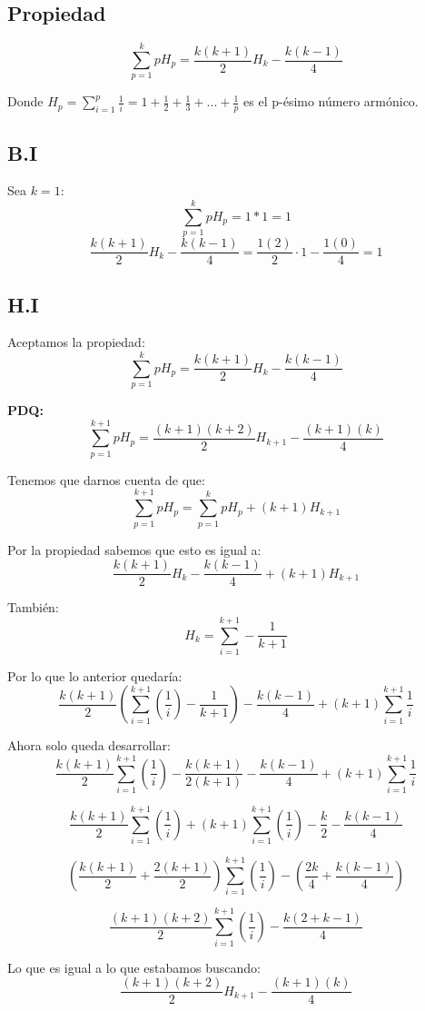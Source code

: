 \documentclass[../doc.tex]{subfiles}
\begin{document}
\subsection{Propiedad}
\[\sum_{p=1}^{k} pH_p = \frac{k(k + 1)}{2}H_k - \frac{k(k-1)}{4}\]

Donde \(H_p = \sum_{i=1}^{p} \frac{1}{i} = 1 + \frac{1}{2} + \frac{1}{3}
+ ... +\frac{1}{p}\) es el p-ésimo número armónico.

\subsection{B.I}
Sea \(k = 1\):
\[\sum_{p=1}^{k} pH_p = 1*1 = 1\]
\[\frac{k(k + 1)}{2}H_k - \frac{k(k-1)}{4} = \frac{1(2)}{2} \cdot 1 - \frac{1(0)}{4} = 1\]

\subsection{H.I}
Aceptamos la propiedad:
\[\sum_{p=1}^{k} pH_p = \frac{k(k + 1)}{2}H_k - \frac{k(k-1)}{4}\]

\textbf{PDQ:}
\[\sum_{p=1}^{k+1} pH_p = \frac{(k+1)(k+2)}{2}H_{k+1} - \frac{(k+1)(k)}{4}\]

\noindent Tenemos que darnos cuenta de que:
\[\sum_{p=1}^{k+1} pH_p = \sum_{p=1}^{k} pH_p + (k+1)H_{k+1}\]

\noindent Por la propiedad sabemos que esto es igual a:
\[\frac{k(k + 1)}{2}H_k - \frac{k(k-1)}{4} + (k+1)H_{k+1}\]

\noindent También:
\[ H_{k} = \sum_{i=1}^{k+1} - \frac{1}{k+1}\]

\noindent Por lo que lo anterior quedaría:
\[\frac{k(k + 1)}{2}(\sum_{i=1}^{k+1} (\frac{1}{i}) - \frac{1}{k+1})
- \frac{k(k-1)}{4} + (k+1)\sum_{i=1}^{k+1} \frac{1}{i}\]

\noindent Ahora solo queda desarrollar:
\[\frac{k(k + 1)}{2}\sum_{i=1}^{k+1} (\frac{1}{i}) - \frac{k(k + 1)}{2(k+1)}
- \frac{k(k-1)}{4} + (k+1)\sum_{i=1}^{k+1} \frac{1}{i}\]

\[\frac{k(k + 1)}{2}\sum_{i=1}^{k+1} (\frac{1}{i})
+ (k+1)\sum_{i=1}^{k+1} (\frac{1}{i}) - \frac{k}{2} - \frac{k(k-1)}{4}\]

\[(\frac{k(k + 1)}{2} + \frac{2(k+1)}{2})\sum_{i=1}^{k+1} (\frac{1}{i})
- (\frac{2k}{4} + \frac{k(k-1)}{4})\]

\[\frac{(k + 1)(k + 2)}{2}\sum_{i=1}^{k+1} (\frac{1}{i}) - \frac{k(2 + k - 1)}{4}\]

\noindent Lo que es igual a lo que estabamos buscando:
\[\frac{(k+1)(k+2)}{2}H_{k+1} - \frac{(k+1)(k)}{4}\]
\end{document}
